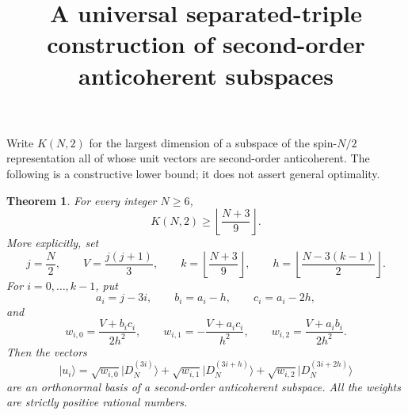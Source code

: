 \documentclass[11pt]{article}
\newtheorem{theorem}{Theorem}
\newcommand{\ket}[1]{\lvert #1\rangle}
\begin{document}
\title{A universal separated-triple construction of second-order anticoherent subspaces}
\author{}
\date{}
\maketitle

Write $K(N,2)$ for the largest dimension of a subspace of the spin-$N/2$
representation all of whose unit vectors are second-order anticoherent.
The following is a constructive lower bound; it does not assert general
optimality.

\begin{theorem}
For every integer $N\ge6$,
\[
 K(N,2)\ge \left\lfloor\frac{N+3}{9}\right\rfloor.
\]
More explicitly, set
\[
 j=\frac N2,\qquad V=\frac{j(j+1)}3,\qquad
 k=\left\lfloor\frac{N+3}{9}\right\rfloor,\qquad
 h=\left\lfloor\frac{N-3(k-1)}2\right\rfloor.
\]
For $i=0,\ldots,k-1$, put
\[
 a_i=j-3i,\qquad b_i=a_i-h,\qquad c_i=a_i-2h,
\]
and
\[
 w_{i,0}=\frac{V+b_ic_i}{2h^2},\qquad
 w_{i,1}=-\frac{V+a_ic_i}{h^2},\qquad
 w_{i,2}=\frac{V+a_ib_i}{2h^2}.
\]
Then the vectors
\[
 \ket{u_i}=
 \sqrt{w_{i,0}}\ket{D_N^{(3i)}}+
 \sqrt{w_{i,1}}\ket{D_N^{(3i+h)}}+
 \sqrt{w_{i,2}}\ket{D_N^{(3i+2h)}}
\]
are an orthonormal basis of a second-order anticoherent subspace.  All the
weights are strictly positive rational numbers.
\end{theorem}
\end{document}
